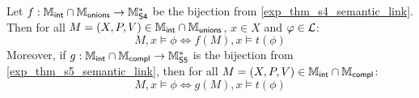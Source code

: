\begin{theorem}
\label{exp_thm_s4s5_translation}

    Let $f: \mathbb{M}_{\mathsf{int}} \cap \mathbb{M}_{\mathsf{unions}} \to \mathbb{M}^*_{\mathsf{S4}}$ be the bijection from
    \cref{exp_thm_s4_semantic_link}. Then for all $M = (X, P, V) \in \mathbb{M}_{\mathsf{int}}
    \cap \mathbb{M}_{\mathsf{unions}}$, $x \in X$ and $\varphi \in \mathcal{L}$:
    \begin{equation}
        \label{exp_eqn_s4s5_1}
        M, x \models \phi \iff f(M), x \models t(\phi)
    \end{equation}
    Moreover, if $g: \mathbb{M}_{\mathsf{int}} \cap \mathbb{M}_{\mathsf{compl}} \to \mathbb{M}^*_{\mathsf{S5}}$ is the bijection from
    \cref{exp_thm_s5_semantic_link}, then for all $M = (X, P, V) \in
    \mathbb{M}_{\mathsf{int}} \cap \mathbb{M}_{\mathsf{compl}}$:
    \begin{equation}
        \label{exp_eqn_s4s5_2}
        M, x \models \phi \iff g(M), x \models t(\phi)
    \end{equation}
\end{theorem}

